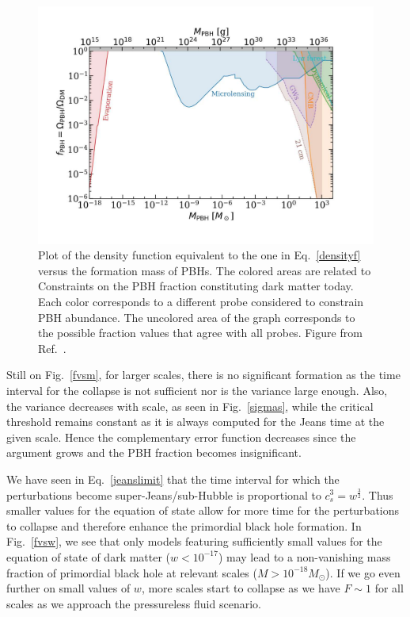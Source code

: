 \documentclass[a4paper,11pt]{article}
\begin{document}
\begin{figure}[tbp]
	\centering
	\includegraphics[width=1.0\linewidth]{pbh_dm}
	\caption{Plot of the density function equivalent to the one in Eq.~\eqref{densityf} versus the formation mass of PBHs. The colored areas are related to Constraints on the PBH fraction constituting dark matter today. Each color corresponds to a different probe considered to constrain PBH abundance. The uncolored area of the graph corresponds to the possible fraction values that agree with all probes. Figure from Ref.~\cite{Villanueva2021}.}
	\label{fig:pbhdm}
\end{figure}

Still on Fig.~\ref{fvsm}, for larger scales, there is no significant formation as the time interval for the collapse is not sufficient nor is the variance large enough. Also, the variance decreases with scale, as seen in Fig.~\ref{sigmas}, while the critical threshold remains constant as it is always computed for the Jeans time at the given scale. Hence the complementary error function decreases since the argument grows and the PBH fraction becomes insignificant. 

We have seen in Eq.~\eqref{jeanslimit} that the time interval for which the perturbations become super-Jeans/sub-Hubble is proportional to $c_s^3 = w^{\frac{3}{2}}$. Thus smaller values for the equation of state allow for more time for the perturbations to collapse and therefore enhance the primordial black hole formation. In Fig.~\ref{fvsw}, we see that only models featuring sufficiently small values for the equation of state of dark matter ($w < 10^{-17}$) may lead to a non-vanishing mass fraction of primordial black hole at relevant scales ($M >  10^{-18}M_\odot$). If we go even further on small values of $w$, more scales start to collapse as we have $F\sim 1$ for all scales as we approach the pressureless fluid scenario.  
\end{document}
